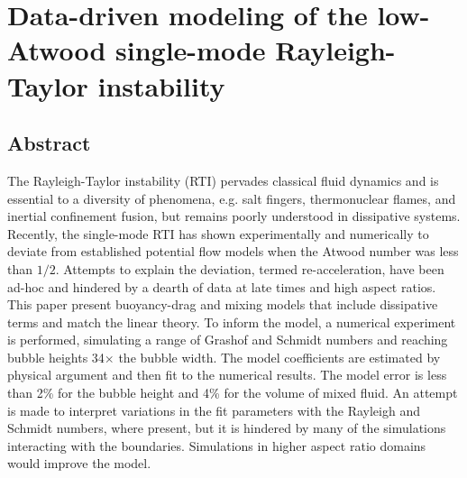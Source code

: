 \chapter{Data-driven modeling of the low-Atwood single-mode Rayleigh-Taylor instability}

\section{Abstract}

The Rayleigh-Taylor instability (RTI) pervades classical fluid dynamics and is essential to a diversity of phenomena, e.g. salt fingers, thermonuclear flames, and inertial confinement fusion, but remains poorly understood in dissipative systems.
Recently, the single-mode RTI has shown experimentally and numerically to deviate from established potential flow models when the Atwood number was less than $1/2$.
Attempts to explain the deviation, termed re-acceleration, have been ad-hoc and hindered by a dearth of data at late times and high aspect ratios.
This paper present buoyancy-drag and mixing models that include dissipative terms and match the linear theory.
To inform the model, a numerical experiment is performed, simulating a range of Grashof and Schmidt numbers and reaching bubble heights 34$\times$ the bubble width.
The model coefficients are estimated by physical argument and then fit to the numerical results.
The model error is less than 2\% for the bubble height and 4\% for the volume of mixed fluid.
An attempt is made to interpret variations in the fit parameters with the Rayleigh and Schmidt numbers, where present, but it is hindered by many of the simulations interacting with the boundaries.
Simulations in higher aspect ratio domains would improve the model.















